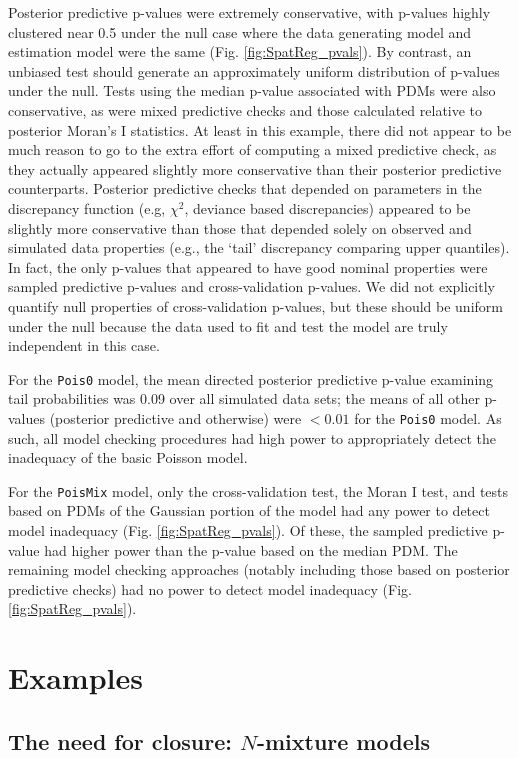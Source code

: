 \documentclass[12pt,english]{article}
\begin{document}
\begin{spacing}{1.9}
Posterior predictive p-values were extremely conservative, with
p-values highly clustered near 0.5 under the null case where the data
generating model and estimation model were the same
(Fig. \ref{fig:SpatReg_pvals}).  By contrast, an unbiased test should
generate an approximately uniform distribution of p-values under the
null.  Tests using the median p-value associated with PDMs were also
conservative, as were mixed predictive checks and those calculated
relative to posterior Moran's I statistics.  At least in this example,
there did not appear to be much reason to go to the extra effort of
computing a mixed predictive check, as they actually appeared slightly
more conservative than their posterior predictive counterparts.
Posterior predictive checks that depended on parameters in the
discrepancy function (e.g, $\chi^2$, deviance based discrepancies)
appeared to be slightly more conservative than those that depended
solely on observed and simulated data properties (e.g., the `tail'
discrepancy comparing upper quantiles).  In fact, the only p-values
that appeared to have good nominal properties were sampled predictive
p-values and cross-validation p-values.  We did not explicitly
quantify null properties of cross-validation p-values, but these
should be uniform under the null because the data used to fit and test
the model are truly independent in this case.

For the \texttt{Pois0} model, the mean directed posterior predictive
p-value examining tail probabilities was 0.09 over all simulated data
sets; the means of all other p-values (posterior predictive and
otherwise) were $<0.01$ for the \texttt{Pois0} model.  As such, all
model checking procedures had high power to appropriately detect the
inadequacy of the basic Poisson model.

For the \texttt{PoisMix} model, only the cross-validation test, the
Moran I test, and tests based on PDMs of the Gaussian portion of the
model had any power to detect model inadequacy
(Fig. \ref{fig:SpatReg_pvals}).  Of these, the sampled predictive
p-value had higher power than the p-value based on the median PDM.
The remaining model checking approaches (notably including those based
on posterior predictive checks) had no power to detect model
inadequacy (Fig. \ref{fig:SpatReg_pvals}).


\section{Examples}


\subsection*{The need for closure: $N$-mixture models}


\end{spacing}
\end{document}
